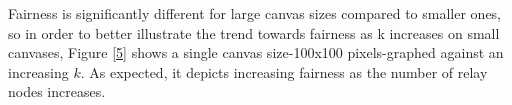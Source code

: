 Fairness is significantly different for large canvas sizes compared to smaller ones, so in order to better illustrate the trend towards fairness as k increases on small canvases, Figure \ref{5} shows a single canvas size-100x100 pixels-graphed against an increasing $k$.  As expected, it depicts increasing fairness as the number of relay nodes increases.

